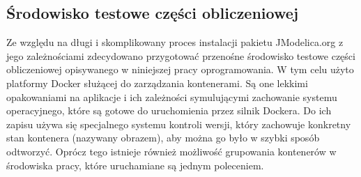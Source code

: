 \subsection{Środowisko testowe części obliczeniowej}
\label{sub:czesc-wyzsza-docker}

Ze względu na długi i skomplikowany proces instalacji pakietu JModelica.org z jego zależnościami zdecydowano przygotować przenośne środowisko testowe części obliczeniowej opisywanego w niniejszej pracy oprogramowania. W tym celu użyto platformy Docker służącej do zarządzania kontenerami. Są one lekkimi opakowaniami na aplikacje i ich zależności symulującymi zachowanie systemu operacyjnego, które są gotowe do uruchomienia przez silnik Dockera. Do ich zapisu używa się specjalnego systemu kontroli wersji, który zachowuje konkretny stan kontenera (nazywany obrazem), aby można go było w szybki sposób odtworzyć.
Oprócz tego istnieje również możliwość grupowania kontenerów w środowiska pracy, które uruchamiane są jednym poleceniem.

